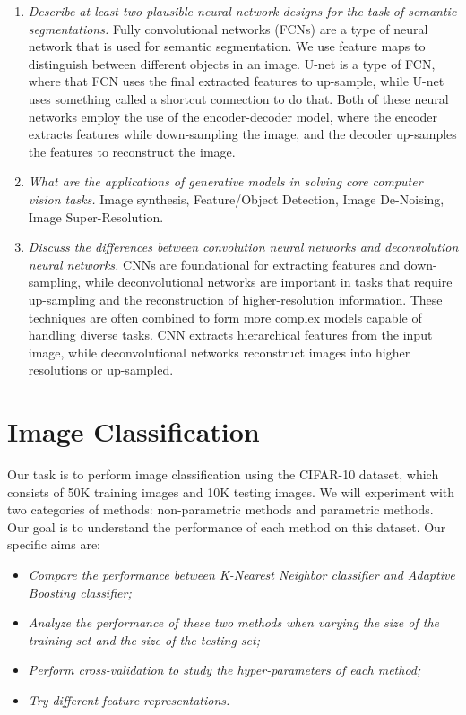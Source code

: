 \documentclass[11pt]{article}
\begin{document}
\begin{enumerate}
        \item \textit{Describe at least two plausible neural network designs for the task of semantic segmentations.}
        Fully convolutional networks (FCNs) are a type of neural network that is used for semantic segmentation. We
        use feature maps to distinguish between different objects in an image.
        U-net is a type of FCN, where that FCN uses the final extracted features to up-sample, while U-net uses
        something called a shortcut connection to do that.
        Both of these neural networks employ the use of the encoder-decoder model, where the encoder extracts features
        while down-sampling the image, and the decoder up-samples the features to reconstruct the image.

        \item \textit{What are the applications of generative models in solving core computer vision tasks.}
        Image synthesis, Feature/Object Detection, Image De-Noising, Image Super-Resolution.

        \item \textit{Discuss the differences between convolution neural networks and deconvolution neural networks.}
        CNNs are foundational for extracting features and down-sampling, while deconvolutional networks are
        important in tasks that require up-sampling and the reconstruction of higher-resolution information.
        These techniques are often combined to form more complex models capable of handling diverse tasks.
        CNN extracts hierarchical features from the input image, while deconvolutional networks reconstruct images
        into higher resolutions or up-sampled.
    \end{enumerate}


    \section{Image Classification}

    Our task is to perform image classification using the CIFAR-10 dataset, which consists of 50K training images and
    10K testing images. We will experiment with two categories of methods: non-parametric methods and parametric
    methods.
    Our goal is to understand the performance of each method on this dataset. Our specific aims are:
    \begin{itemize}
        \item \textit{Compare the performance between K-Nearest Neighbor classifier and Adaptive Boosting classifier;}
        \item \textit{Analyze the performance of these two methods when varying the size of the training set
        and the size of the testing set;}
        \item \textit{Perform cross-validation to study the hyper-parameters of each method;}
        \item \textit{Try different feature representations.}
    \end{itemize}
\end{document}

